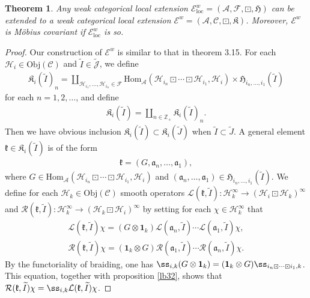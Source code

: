 \documentclass[12pt,a4paper]{article}
\theoremstyle{definition}
\theoremstyle{plain}
\newtheorem{thm}[df]{Theorem}
\newcommand{\fk}{\mathfrak}
\newcommand{\mc}{\mathcal}
\newcommand{\wtd}{\widetilde}
\newcommand{\id}{\mathbf{1}}
\newcommand{\Hom}{\mathrm{Hom}}
\newcommand{\loc}{\mathrm{loc}}
\newcommand{\scr}{\mathscr}
\newcommand{\Jtd}{\widetilde{\mathcal J}}
\newcommand{\mbb}{\mathbb}
\newcommand{\Obj}{\mathrm{Obj}}
\numberwithin{equation}{subsection}
\begin{document}
\begin{thm}\label{lb40}
Any weak categorical local extension $\scr E^w_\loc=(\mc A,\mc F,\boxdot,\fk H)$ can be extended to a weak categorical local extension $\scr E^w=(\mc A,\scr C,\boxdot,\fk K)$. Moreover, $\scr E^w$ is M\"obius covariant if $\scr E^w_\loc$ is so.
\end{thm}

\begin{proof}
Our construction of $\scr E^w$ is similar to that in \cite{Gui21a} theorem 3.15. For each $\mc H_i\in\Obj(\scr C)$ and $\wtd I\in\Jtd$, we define
\begin{gather}
\fk K_i(\wtd I)_{n}=\coprod_{\mc H_{i_1},\dots,\mc H_{i_n}\in\mc F}\Hom_{\mc A}(\mc H_{i_n}\boxdot\cdots\boxdot\mc H_{i_1},\mc H_i)\times\fk H_{i_n,\dots,i_1}(\wtd I)
\end{gather}
for each $n=1,2,\dots$, and define
\begin{gather}
\fk K_i(\wtd I)=\coprod_{n\in\mbb Z_+}\fk K_i(\wtd I)_n.
\end{gather}
Then we have obvious inclusion $\fk K_i(\wtd I)\subset\fk K_i(\wtd J)$ when $\wtd I\subset\wtd J$. A general element  $\fk k\in\fk K_i(\wtd I)$ is of the form
\begin{align*}
\fk k=(G,\fk a_n,\dots,\fk a_1),
\end{align*}
where $G\in\Hom_{\mc A}(\mc H_{i_n}\boxdot\cdots\boxdot\mc H_{i_1},\mc H_i)$ and $(\fk a_n,\dots,\fk a_1)\in\fk H_{i_n,\dots,i_1}(\wtd I)$. We define for each $\mc H_k\in\Obj(\scr C)$  smooth operators $\mc L(\fk k,\wtd I):\mc H_k^\infty\rightarrow(\mc H_i\boxdot\mc H_k)^\infty$ and $\mc R(\fk k,\wtd I):\mc H_k^\infty\rightarrow(\mc H_k\boxdot\mc H_i)^\infty$ by setting for each $\chi\in\mc H_k^\infty$ that
\begin{gather}
\mc L(\fk k,\wtd I)\chi=(G\otimes\id_k)\mc L(\fk a_n,\wtd I)\cdots\mc L(\fk a_1,\wtd I)\chi,\\
\mc R(\fk k,\wtd I)\chi=(\id_k\otimes G)\mc R(\fk a_1,\wtd I)\cdots\mc R(\fk a_n,\wtd I)\chi.
\end{gather}
By the functoriality of braiding, one has $\ss_{i,k}(G\otimes\id_k)=(\id_k\otimes G)\ss_{i_n\boxdot\cdots\boxdot i_1,k}$. This equation, together with proposition \ref{lb32}, shows that $\mc R(\fk k,\wtd I)\chi=\ss_{i,k}\mc L(\fk k,\wtd I)\chi$. 


\end{proof}
\end{document}
